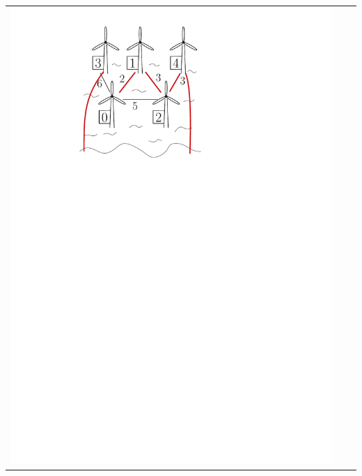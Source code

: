 \begin{center}
\begin{tabular}{p{} p{} p{}}
\includegraphics[width=\textwidth]{sample1q2} &

\end{tabular}
\end{center}
